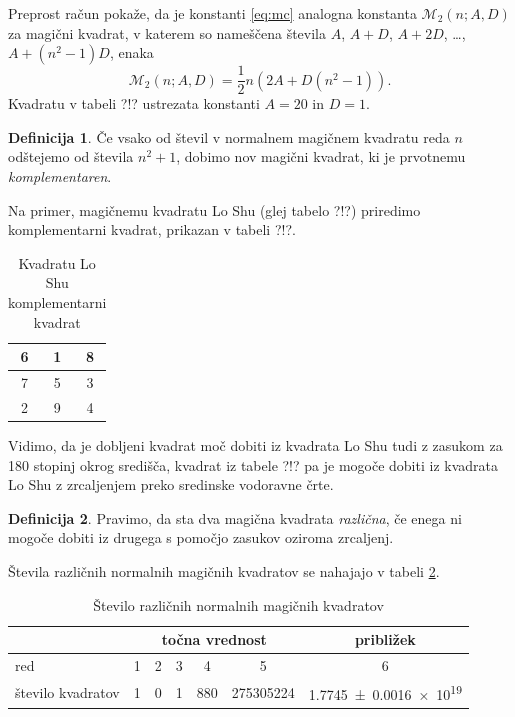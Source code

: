 \documentclass[a4paper,12pt]{article}
\newcommand{\pojem}[1]{\emph{\color{purple}#1}}
\newenvironment{magic}[3]{\begin{table}[!ht]
   \centering
   \caption{#1}
   \label{#2}
   \large
   \begin{tabular}{|*{#3}{c|}}
   \hline}{ \end{tabular}
   \normalsize
\end{table}}
\newcommand{\m}{\mathcal{M}_2}
\theoremstyle{definition}
\newtheorem{definicija}{Definicija}
\theoremstyle{plain}
\begin{document}
Preprost račun pokaže, da je konstanti \eqref{eq:mc} analogna konstanta
\(\m(n;A,D)\) za magični kvadrat, v katerem so nameščena števila
\(A\), \(A+D\), \(A+2D\), \ldots, \(A+(n^2-1)D\), enaka
\[
   \m(n;A,D) = \frac{1}{2} n \left(2A+D(n^2-1)\right).
\]
Kvadratu v tabeli ?!? ustrezata konstanti \(A=20\) in \(D=1\). %

\begin{definicija}
   Če vsako od števil v normalnem magičnem kvadratu reda \(n\) odštejemo
   od števila \(n^2+1\), dobimo nov magični kvadrat, ki je prvotnemu
   \pojem{\color{purple}komplementaren}.
\end{definicija}

Na primer, magičnemu kvadratu Lo Shu (glej tabelo ?!?) priredimo
komplementarni kvadrat, prikazan v tabeli ?!?. %
%
\begin{magic}{Kvadratu Lo Shu komplementarni kvadrat}{table:closhu}{3}
   6 & 1 & 8 \\\hline
   7 & 5 & 3 \\\hline
   2 & 9 & 4 \\\hline
\end{magic}

Vidimo, da je dobljeni kvadrat moč dobiti iz kvadrata Lo Shu tudi z zasukom za
180 stopinj okrog središča, kvadrat iz tabele ?!? pa je mogoče dobiti
iz kvadrata Lo Shu z zrcaljenjem preko sredinske vodoravne črte. %

\begin{definicija}
   Pravimo, da sta dva magična kvadrata \pojem{\color{purple}različna}, če enega ni mogoče dobiti
   iz drugega s pomočjo zasukov oziroma zrcaljenj.
\end{definicija}

Števila različnih normalnih magičnih kvadratov se nahajajo v tabeli \ref{table:stevila}.

\begin{table}[!ht]
   \centering
   \caption{Število različnih normalnih magičnih kvadratov}
   \label{table:stevila}
   \begin{tabular}{lcccccc}\toprule
      & \multicolumn{5}{c}{točna vrednost} & približek \\
      \midrule
      red & 1 & 2 & 3 & 4 & 5 & 6 \\
      število kvadratov & 1 & 0 & 1 & 880 & \num{275305224} & \num[separate-uncertainty]{1.7745 \pm 0.0016 e19} \\
      \bottomrule
   \end{tabular}
\end{table}
\end{document}
